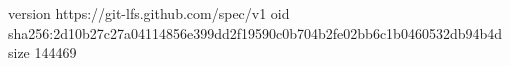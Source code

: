 version https://git-lfs.github.com/spec/v1
oid sha256:2d10b27c27a04114856e399dd2f19590c0b704b2fe02bb6c1b0460532db94b4d
size 144469
